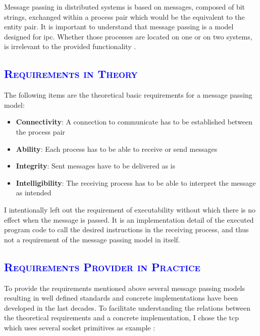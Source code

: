 \documentclass[xcolor=dvipsnames]{article}
\begin{document}
\noindent Message passing in distributed systems is based on messages, composed of bit strings, exchanged within a process pair which would be the equivalent to the entity pair. It is important to understand that message passing is a model designed for \gls{ipc}. Whether those processes are located on one or on two systems, is irrelevant to the provided functionality \cite[ch. 4 - 4.1.1 on p. 115 - 117]{tanenbaum}.

\subsection{\scshape{\textcolor{blue}{Requirements in Theory}}}

\noindent The following items are the theoretical basic requirements for a message passing model:

\begin{itemize}

\item \textbf{Connectivity}: A connection to communicate has to be established between the process pair
\item \textbf{Ability}: Each process has to be able to receive or send messages
\item \textbf{Integrity}: Sent messages have to be delivered as is
\item \textbf{Intelligibility}: The receiving process has to be able to interpret the message as intended

\end{itemize}

\noindent I intentionally left out the requirement of executability without which there is no effect when the message is passed. It is an implementation detail of the executed program code to call the desired instructions in the receiving process, and thus not a requirement of the message passing model in itself.

\subsection{\scshape{\textcolor{blue}{Requirements Provider in Practice}}}

\noindent To provide the requirements mentioned above several message passing models resulting in well defined standards and concrete implementations have been developed in the last decades. To facilitate understanding the relations between the theoretical requirements and a concrete implementation, I chose the \gls{tcp} which uses several socket primitives as example \cite[chap 4.3.1 on p. 141 - 142]{tanenbaum}:
\end{document}
